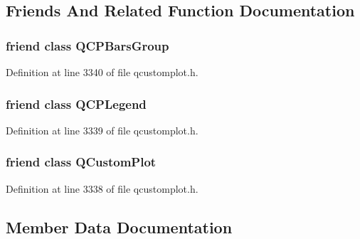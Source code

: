 \subsection{Friends And Related Function Documentation}
\hypertarget{class_q_c_p_bars_ae1051b4d58a2786cb420367a586e2fee}{}
\subsubsection[{Q\+C\+P\+Bars\+Group}]{\setlength{\rightskip}{0pt plus 5cm}friend class {\bf Q\+C\+P\+Bars\+Group}\hspace{0.3cm}{\ttfamily [friend]}}\label{class_q_c_p_bars_ae1051b4d58a2786cb420367a586e2fee}


Definition at line 3340 of file qcustomplot.\+h.

\hypertarget{class_q_c_p_bars_a8429035e7adfbd7f05805a6530ad5e3b}{}
\subsubsection[{Q\+C\+P\+Legend}]{\setlength{\rightskip}{0pt plus 5cm}friend class {\bf Q\+C\+P\+Legend}\hspace{0.3cm}{\ttfamily [friend]}}\label{class_q_c_p_bars_a8429035e7adfbd7f05805a6530ad5e3b}


Definition at line 3339 of file qcustomplot.\+h.

\hypertarget{class_q_c_p_bars_a1cdf9df76adcfae45261690aa0ca2198}{}
\subsubsection[{Q\+Custom\+Plot}]{\setlength{\rightskip}{0pt plus 5cm}friend class {\bf Q\+Custom\+Plot}\hspace{0.3cm}{\ttfamily [friend]}}\label{class_q_c_p_bars_a1cdf9df76adcfae45261690aa0ca2198}


Definition at line 3338 of file qcustomplot.\+h.



\subsection{Member Data Documentation}
\hypertarget{class_q_c_p_bars_a0c1c46076c41a478dbb373cfd35929aa}{}
